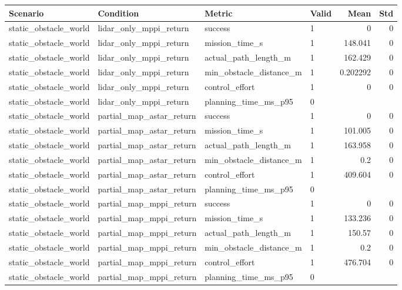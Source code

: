 \begin{tabular}{llllrr}
\hline
Scenario & Condition & Metric & Valid & Mean & Std \\
\hline
static\_obstacle\_world & lidar\_only\_mppi\_return & success & 1 & 0 & 0 \\
static\_obstacle\_world & lidar\_only\_mppi\_return & mission\_time\_s & 1 & 148.041 & 0 \\
static\_obstacle\_world & lidar\_only\_mppi\_return & actual\_path\_length\_m & 1 & 162.429 & 0 \\
static\_obstacle\_world & lidar\_only\_mppi\_return & min\_obstacle\_distance\_m & 1 & 0.202292 & 0 \\
static\_obstacle\_world & lidar\_only\_mppi\_return & control\_effort & 1 & 0 & 0 \\
static\_obstacle\_world & lidar\_only\_mppi\_return & planning\_time\_ms\_p95 & 0 &  &  \\
static\_obstacle\_world & partial\_map\_astar\_return & success & 1 & 0 & 0 \\
static\_obstacle\_world & partial\_map\_astar\_return & mission\_time\_s & 1 & 101.005 & 0 \\
static\_obstacle\_world & partial\_map\_astar\_return & actual\_path\_length\_m & 1 & 163.958 & 0 \\
static\_obstacle\_world & partial\_map\_astar\_return & min\_obstacle\_distance\_m & 1 & 0.2 & 0 \\
static\_obstacle\_world & partial\_map\_astar\_return & control\_effort & 1 & 409.604 & 0 \\
static\_obstacle\_world & partial\_map\_astar\_return & planning\_time\_ms\_p95 & 0 &  &  \\
static\_obstacle\_world & partial\_map\_mppi\_return & success & 1 & 0 & 0 \\
static\_obstacle\_world & partial\_map\_mppi\_return & mission\_time\_s & 1 & 133.236 & 0 \\
static\_obstacle\_world & partial\_map\_mppi\_return & actual\_path\_length\_m & 1 & 150.57 & 0 \\
static\_obstacle\_world & partial\_map\_mppi\_return & min\_obstacle\_distance\_m & 1 & 0.2 & 0 \\
static\_obstacle\_world & partial\_map\_mppi\_return & control\_effort & 1 & 476.704 & 0 \\
static\_obstacle\_world & partial\_map\_mppi\_return & planning\_time\_ms\_p95 & 0 &  &  \\
\hline
\end{tabular}
